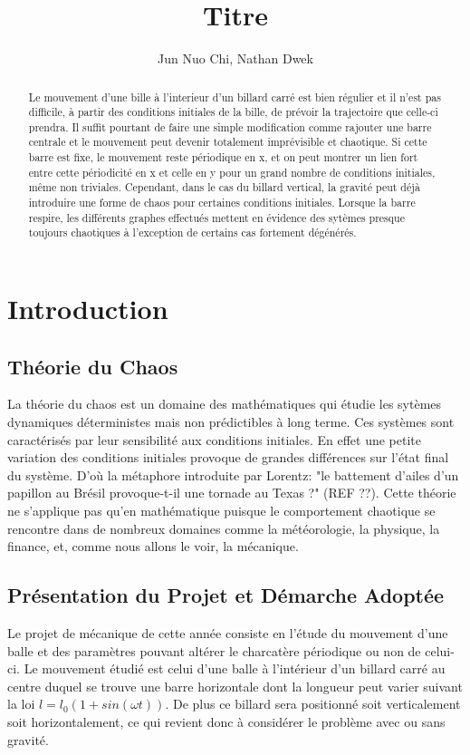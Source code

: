 \documentclass[a4paper]{report}
\title{Titre}
\author{Jun Nuo Chi, Nathan Dwek}
\begin{document}
\maketitle
\tableofcontents
\begin{abstract}

Le mouvement d'une bille à l'interieur d'un billard carré est bien régulier et il n'est pas difficile, à partir des conditions initiales de la bille, de prévoir la trajectoire que celle-ci prendra. Il suffit pourtant de faire une simple modification comme rajouter une barre centrale et le mouvement peut devenir totalement imprévisible et chaotique.
Si cette barre est fixe, le mouvement reste périodique en x, et on peut montrer un lien fort entre cette périodicité en x et celle en y pour un grand nombre de conditions initiales, même non triviales. Cependant, dans le cas du billard vertical, la gravité peut déjà introduire une forme de chaos pour certaines conditions initiales. Lorsque la barre respire, les différents graphes effectués mettent en évidence des sytèmes presque toujours chaotiques à l'exception de certains cas fortement dégénérés.

\end{abstract}

\chapter{Introduction}

\section{Théorie du Chaos}
La théorie du chaos est un domaine des mathématiques qui étudie les sytèmes dynamiques déterministes mais non prédictibles à long terme. Ces systèmes sont caractérisés par leur sensibilité aux conditions initiales. En effet une petite variation des conditions initiales provoque de grandes différences sur l'état final du système. D'où la métaphore introduite par Lorentz: "le battement d'ailes d'un papillon au Brésil provoque-t-il une tornade au Texas ?" (REF ??). Cette théorie ne s'applique pas qu'en mathématique puisque le comportement chaotique se rencontre dans de nombreux domaines comme la météorologie, la physique, la finance, et, comme nous allons le voir, la mécanique.

\section{Présentation du Projet et Démarche Adoptée}
Le projet de mécanique de cette année consiste en l'étude du mouvement d'une balle et des paramètres pouvant altérer le charcatère périodique ou non de celui-ci. Le mouvement étudié est celui d'une balle à l'intérieur d'un billard carré au centre duquel se  trouve une barre horizontale dont la longueur peut varier suivant la loi \(l=l_0(1+sin(\omega t)) \). De plus ce billard sera positionné soit verticalement soit horizontalement, ce qui revient donc à considérer le problème avec ou sans gravité.
\end{document}
